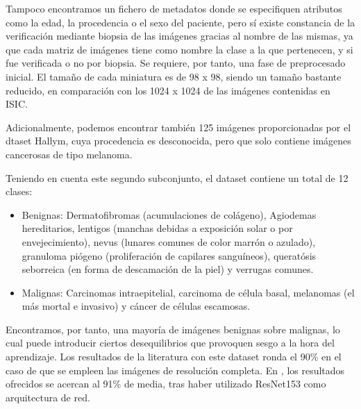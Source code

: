 Tampoco encontramos un fichero de metadatos donde se especifiquen atributos como la edad, la procedencia o el sexo del paciente, pero sí existe constancia de la verificación mediante biopsia de las imágenes gracias al nombre de las mismas, ya que cada matriz de imágenes tiene como nombre la clase a la que pertenecen, y si fue verificada o no por biopsia. Se requiere, por tanto, una fase de preprocesado inicial. El tamaño de cada miniatura es de 98 x 98, siendo un tamaño bastante reducido, en comparación con los 1024 x 1024 de las imágenes contenidas en ISIC.

Adicionalmente, podemos encontrar también 125 imágenes proporcionadas por el dtaset Hallym, cuya procedencia es desconocida, pero que solo contiene imágenes cancerosas de tipo melanoma.

Teniendo en cuenta este segundo subconjunto, el dataset contiene un total de 12 clases:
\begin{itemize}
	\item Benignas: Dermatofibromas (acumulaciones de colágeno), Agiodemas hereditarios, lentigos (manchas debidas a exposición solar o por envejecimiento), nevus (lunares comunes de color marrón o azulado), granuloma piógeno (proliferación de capilares sanguíneos), queratósis seborreica (en forma de descamación de la piel) y verrugas comunes.
	 \item Malignas: Carcinomas intraepitelial, carcinoma de célula basal, melanomas (el más mortal e invasivo) y cáncer de células escamosas.
\end{itemize}

Encontramos, por tanto, una mayoría de imágenes benignas sobre malignas, lo cual puede introducir ciertos desequilibrios que provoquen sesgo a la hora del aprendizaje. Los resultados de la literatura con este dataset ronda el 90\% en el caso de que se empleen las imágenes de resolución completa. En \cite{HAN20189}, los resultados ofrecidos se acercan al 91\% de media, tras haber utilizado ResNet153 como arquitectura de red.


